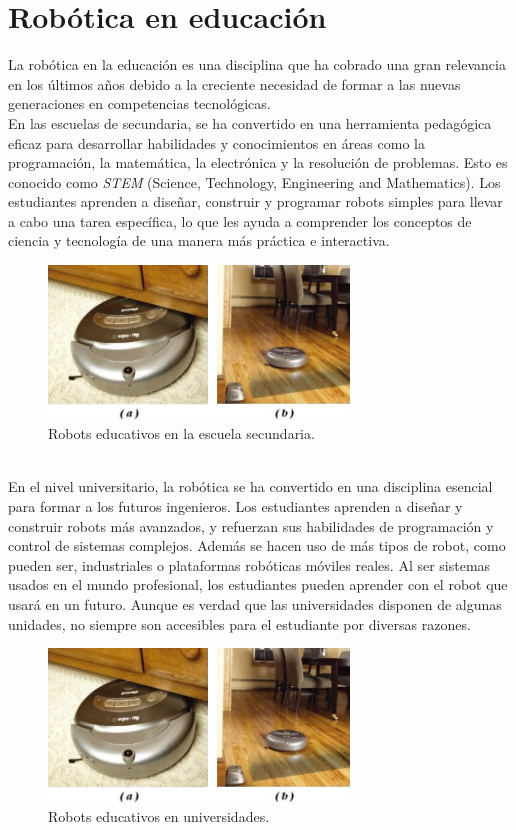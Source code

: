 \section{Robótica en educación}
\label{sec:segundaseccion}
La robótica en la educación es una disciplina que ha cobrado una gran relevancia en los últimos años debido a la creciente necesidad 
de formar a las nuevas generaciones en competencias tecnológicas. 
\\En las escuelas de secundaria, se ha convertido en una herramienta pedagógica eficaz para desarrollar habilidades y conocimientos en áreas como la programación, 
la matemática, la electrónica y la resolución de problemas. Esto es conocido como \textit{STEM} (Science, Technology, Engineering and Mathematics). Los 
estudiantes aprenden a diseñar, construir y programar robots simples para llevar a cabo una tarea específica, lo que les ayuda a comprender  
los conceptos de ciencia y tecnología de una manera más práctica e interactiva.\\
\begin{figure} [h!]
  \begin{center}
    \includegraphics[width=8cm]{figs/roomba}
  \end{center}
  \caption{Robots educativos en la escuela secundaria.}
  \label{fig:robSecundaria}
\end{figure}\
\\En el nivel universitario, la robótica se ha convertido en una disciplina esencial para formar a los futuros ingenieros. Los estudiantes aprenden 
a diseñar y construir robots más avanzados, y refuerzan sus habilidades de programación y control de sistemas complejos. Además se hacen uso de más tipos 
de robot, como pueden ser, industriales o plataformas robóticas móviles reales. Al ser sistemas usados en el mundo profesional, los estudiantes pueden 
aprender con el robot que usará en un futuro. Aunque es verdad que las universidades disponen de algunas unidades, no siempre son accesibles para el 
estudiante por diversas razones.
\newpage
\begin{figure} [h!]
  \begin{center}
    \includegraphics[width=8cm]{figs/roomba}
  \end{center}
  \caption{Robots educativos en universidades.}
  \label{fig:robUniversidades}
\end{figure}\
